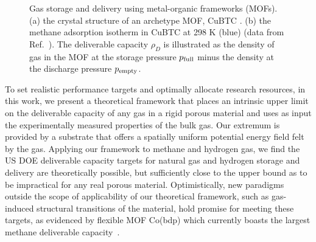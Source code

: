 \begin{figure}
    \centering
    \qquad
    \caption{Gas storage and delivery using metal-organic frameworks (MOFs). (a) the crystal structure of an archetype MOF, CuBTC \cite{chui1999chemically}. (b) the methane adsorption isotherm in CuBTC \cite{chui1999chemically} at 298 K (blue) (data from Ref.~\cite{mason2014evaluating}). The deliverable capacity $\rho_D$ is illustrated as the density of gas in the MOF at the storage pressure $p_{\text{full}}$ minus the density at the discharge pressure $p_{\text{empty}}$.
    }
    \label{fig:fig1}
\end{figure}

To set realistic performance targets and optimally allocate research resources,
in this work, we present a theoretical framework that places an intrinsic upper
limit on the deliverable capacity of any gas in a rigid porous material and
uses as input the experimentally measured properties of the bulk gas. Our
extremum is provided by a substrate that offers a spatially uniform potential
energy field felt by the gas. Applying our framework to methane and hydrogen
gas, we find the US DOE deliverable capacity targets for natural gas and
hydrogen storage and delivery are theoretically possible, but sufficiently
close to the upper bound as to be impractical for any real porous material.
Optimistically, new paradigms outside the scope of applicability of our
theoretical framework, such as gas-induced structural transitions of the
material, hold promise for meeting these targets, as evidenced by flexible MOF
Co(bdp) which currently boasts the largest methane deliverable
capacity~\cite{mason2015methane}.

